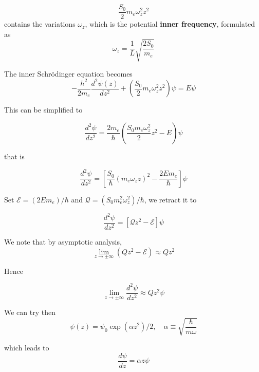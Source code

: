 \begin{equation}
  \frac{S_0}{2} m_{e} \omega_{z}^{2} z^{2}
\end{equation}
contains the variations $\omega_{z}$, which is the potential \textbf{inner frequency}, formulated as
\begin{equation}
  \omega_{z} = \frac{1}{L} \sqrt{\frac{2S_0}{m_{e}}}
\end{equation}

The inner Schrödinger equation becomes \begin{equation}
  -  \frac{h^{2}}{2m_e} \frac{d^{2}\psi(z)}{dz^{2}} + \left(\frac{S_0}{2} m_{e} \omega_{z}^{2} z^{2}\right)\psi = E\psi
\end{equation}

This can be simplified to 

\begin{equation}
  \frac{d^{2}\psi}{dz^{2}} = \frac{2m_e}{\hbar}\left( \frac{S_0 m_e \omega_{z}^{2}}{2} z^{2} - E  \right)\psi 
\end{equation}

that is 

\begin{equation}
  \frac{d^{2}\psi}{dz^{2}} = \left[
    \frac{S_0}{\hbar} (m_e \omega_z z)^{2} - \frac{2Em_e}{\hbar}
  \right]\psi
\end{equation}

Set $\mathcal{E}= (2E m_e)/\hbar$ and $\mathcal{Q}=(S_0 m_{e}^{2} \omega_{z}^{2})/\hbar$, we retract it to 

\begin{equation}
  \frac{d^{2}\psi}{dz^{2}} = \left[
    \mathcal{Q} z^{2} - \mathcal{E}
  \right]\psi
\end{equation}

We note that by asymptotic analysis, 
\begin{equation}
  \lim_{z \to \pm \infty} (Qz^2 - \mathcal{E}) \approx Qz^{2}
\end{equation}

Hence 

\begin{equation}
  \lim_{z \to \pm \infty} \frac{d^2 \psi}{dz^2 } \approx Qz^2 \psi 
\end{equation}

We can try then \begin{equation}
  \psi(z) = \psi_{0} \exp{(\alpha z^2)/2}, \quad \alpha \equiv \sqrt{\frac{\hbar}{m\omega}}
\end{equation}

which leads to \begin{equation}
  \frac{d\psi}{dz} = \alpha z \psi
\end{equation}

